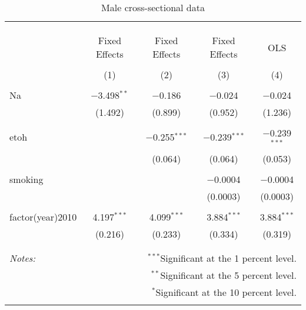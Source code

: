 \documentclass[11pt]{article}\usepackage[]{graphicx}\usepackage[]{color}
\begin{document}
\begin{table}[!htbp] \centering 
  \caption{Male cross-sectional data} 
  \label{tab:mfe} 
\begin{tabular}{@{\extracolsep{5pt}}lcccc} 
\\[-1.8ex]\hline 
\hline \\[-1.8ex] 
\\[-1.8ex] & \multicolumn{4}{c}{ } \\ 
 & Fixed Effects & Fixed Effects & Fixed Effects & OLS \\ 
\\[-1.8ex] & (1) & (2) & (3) & (4)\\ 
\hline \\[-1.8ex] 
 Na & $-$3.498$^{**}$ & $-$0.186 & $-$0.024 & $-$0.024 \\ 
  & (1.492) & (0.899) & (0.952) & (1.236) \\ 
  & & & & \\ 
 etoh &  & $-$0.255$^{***}$ & $-$0.239$^{***}$ & $-$0.239$^{***}$ \\ 
  &  & (0.064) & (0.064) & (0.053) \\ 
  & & & & \\ 
 smoking &  &  & $-$0.0004 & $-$0.0004 \\ 
  &  &  & (0.0003) & (0.0003) \\ 
  & & & & \\ 
 factor(year)2010 & 4.197$^{***}$ & 4.099$^{***}$ & 3.884$^{***}$ & 3.884$^{***}$ \\ 
  & (0.216) & (0.233) & (0.334) & (0.319) \\ 
  & & & & \\ 
\hline 
\hline \\[-1.8ex] 
\textit{Notes:} & \multicolumn{4}{r}{$^{***}$Significant at the 1 percent level.} \\ 
 & \multicolumn{4}{r}{$^{**}$Significant at the 5 percent level.} \\ 
 & \multicolumn{4}{r}{$^{*}$Significant at the 10 percent level.} \\ 
 & \multicolumn{4}{r}{} \\ 
\end{tabular} 
\end{table} 
\end{document}
